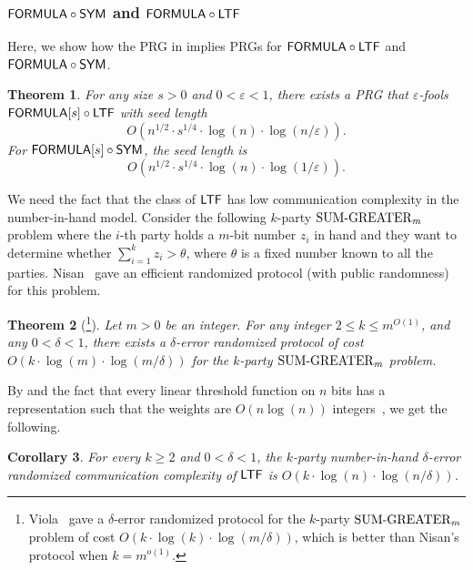 \documentclass[10pt,a4paper]{article}
\newtheorem{theorem}{Theorem}
\newtheorem{corollary}[theorem]{Corollary}
\newcommand{\prblm}[1]{{\uppercase{\rm#1}}}
\newcommand{\SG}{\prblm{SUM\text{-}GREATER}}
\newcommand{\FORMULA}{{\sf FORMULA}}
\newcommand{\LTF}{{\sf LTF}}
\newcommand{\SYM}{{\sf SYM}}
\begin{document}
    \subsubsection{\texorpdfstring{$\FORMULA\circ\SYM$}{FORMULA-SYM} and \texorpdfstring{$\FORMULA\circ\LTF$}{FORMULA-LTF}}
	
	Here, we show how the PRG in  implies PRGs for $\FORMULA\circ\LTF$ and $\FORMULA\circ\SYM$.
	
	\begin{theorem}\label{thm:prg-formula-sym}
		For any size $s>0$ and $0<\varepsilon<1$, there exists a PRG that $\varepsilon$-fools $\FORMULA[s]\circ \LTF$ with seed length
        \[
			O\left(n^{1/2}\cdot s^{1/4}\cdot \log(n)\cdot \log(n/\varepsilon)\right).
		\]
		For $\FORMULA[s]\circ \SYM$, the seed length is
		\[
		    O\left(n^{1/2}\cdot s^{1/4}\cdot \log(n)\cdot \log(1/\varepsilon) \right).
		\]
	\end{theorem}
	
	We need the fact that the class of $\LTF$ has low communication complexity in the number-in-hand model. Consider the following $k$-party $\SG_m$ problem where the $i$-th party holds a $m$-bit number $z_i$ in hand and they want to determine whether $\sum_{i=1}^k z_i > \theta$, where $\theta$ is a fixed number known to all the parties. Nisan~\cite{Nis94} gave an efficient randomized protocol (with public randomness) for this problem.
    
%
%
%
    
    \begin{theorem}[\cite{Nis94}\footnote{Viola~\cite{Vio15} gave a $\delta$-error randomized protocol for the $k$-party $\SG_m$ problem of cost $O(k\cdot\log(k)\cdot\log(m/\delta))$, which is better than Nisan's protocol when $k=m^{o(1)}$.}]\label{thm:prg-k-party-sum}
	    Let $m>0$ be an integer. For any integer $2\leq k\leq m^{O(1)}$, and any $0<\delta<1$, there exists a $\delta$-error randomized protocol of cost $O(k\cdot\log(m)\cdot\log(m/\delta))$ for the $k$-party $\SG_m$ problem.
	\end{theorem}
	    
    By  and the fact that every linear threshold function on $n$ bits has a representation such that the weights are $O(n\log(n))$ integers~\cite{MTT61}, we get the following.
    
    \begin{corollary}\label{cor:prg-k-party-LTF}
         For every $k\geq 2$ and $0<\delta<1$, the $k$-party number-in-hand $\delta$-error randomized communication complexity of $\LTF$ is $O(k\cdot\log(n)\cdot\log(n/\delta))$.
    \end{corollary}
    
\end{document}
